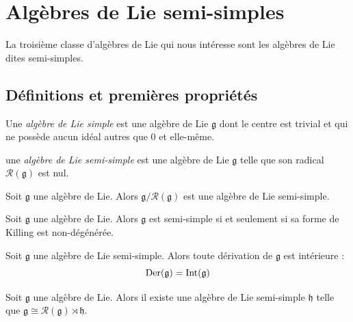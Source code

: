 \omitted

\section{Algèbres de Lie semi-simples}

La troisième classe d'algèbres de Lie qui nous intéresse sont les algèbres de Lie dites semi-simples. 

\subsection{Définitions et premières propriétés}

\begin{definition}
    Une \emph{algèbre de Lie simple} est une algèbre de Lie $\mathfrak{g}$ dont le centre est trivial et qui ne possède aucun idéal autres que $0$ et elle-même.
\end{definition}

\begin{definition}
    une \emph{algèbre de Lie semi-simple} est une algèbre de Lie $\mathfrak{g}$ telle que son radical $\mathcal{R}(\mathfrak{g})$ est nul.
\end{definition}

\begin{proposition}
    Soit $\mathfrak{g}$ une algèbre de Lie. Alors $\mathfrak{g}/\mathcal{R}(\mathfrak{g})$ est une algèbre de Lie semi-simple.
\end{proposition}

\omitted

\begin{proposition}
    Soit $\mathfrak{g}$ une algèbre de Lie. Alors $\mathfrak{g}$ est semi-simple si et seulement si sa forme de Killing est non-dégénérée.
\end{proposition}

\omitted

\begin{proposition}
    Soit $\mathfrak{g}$ une algèbre de Lie semi-simple. Alors toute dérivation de $\mathfrak{g}$ est intérieure :
    $$\operatorname{Der}(\mathfrak{g}) = \mathrm{Int}(\mathfrak{g})$$
\end{proposition}

\omitted

\begin{theorem}
    Soit $\mathfrak{g}$ une algèbre de Lie. Alors il existe une algèbre de Lie semi-simple $\mathfrak{h}$ telle que $\mathfrak{g} \cong \mathcal{R}(\mathfrak{g}) \rtimes \mathfrak{h}$.
\end{theorem}

